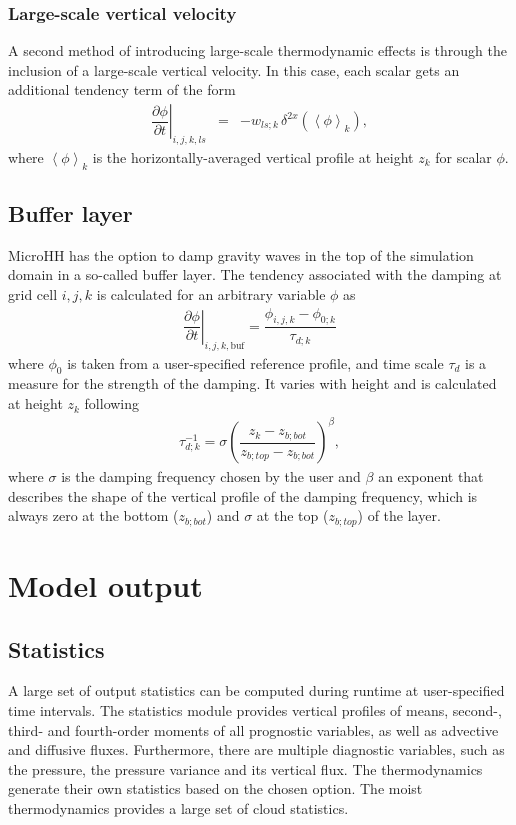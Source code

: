 \documentclass[gmd,manuscript]{copernicus}
\begin{document}
\subsubsection{Large-scale vertical velocity}
A second method of introducing large-scale thermodynamic effects is through the inclusion of a large-scale vertical velocity. In this case, each scalar gets an additional tendency term of the form
\begin{eqnarray}
\left. \dfrac{\partial \phi}{\partial t}\right|_{i,j,k,ls} & = &  - w_{ls;k}\,\delta^{2x} \left( \left< \phi \right>_k \right),
\end{eqnarray}
where $\left< \phi \right>_k$ is the horizontally-averaged vertical profile at height $z_k$ for scalar $\phi$.

\subsection{Buffer layer}
MicroHH has the option to damp gravity waves in the top of the simulation domain in a so-called buffer layer.  The tendency associated with the damping at grid cell $i,j,k$ is calculated for an arbitrary variable $\phi$ as
\begin{eqnarray}
\left. \dfrac{\partial \phi}{\partial t}\right|_{i,j,k,\textrm{buf}} = \dfrac{\phi_{i,j,k} - \phi_{0;k}}{\tau_{d;k}}
\end{eqnarray}
where $\phi_0$ is taken from a user-specified reference profile, and time scale $\tau_d$ is a measure for the strength of the damping. It varies with height and is calculated at height $z_k$ following
\begin{eqnarray}
\tau_{d;k}^{-1} = \sigma \left( \dfrac{z_k - z_{b;bot} }{z_{b;top} - z_{b;bot}} \right)^\beta,
\end{eqnarray}
where $\sigma$ is the damping frequency chosen by the user and $\beta$ an exponent that describes the shape of the vertical profile of the damping frequency, which is always zero at the bottom ($z_{b;bot}$) and $\sigma$ at the top ($z_{b;top}$)  of the layer.

\section{Model output}
\subsection{Statistics}
A large set of output statistics can be computed during runtime at user-specified time intervals. The statistics module provides vertical profiles of means, second-, third- and fourth-order moments of all prognostic variables, as well as advective and diffusive fluxes. Furthermore, there are multiple diagnostic variables, such as the pressure, the pressure variance and its vertical flux. The thermodynamics generate their own statistics based on the chosen option. The moist thermodynamics provides a large set of cloud statistics.
\end{document}
